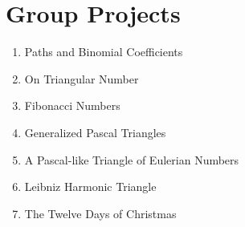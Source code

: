 \documentclass[10pt,]{book}
\theoremstyle{plain}
\theoremstyle{definition}
\theoremstyle{definition}
\theoremstyle{definition}
\numberwithin{equation}{chapter}
\begin{document}
\chapter[{Group Projects}]{Group Projects}\label{app_projects}
\hypertarget{p-1388}{}%
\leavevmode%
\begin{enumerate}
\item\hypertarget{li-178}{}Paths and Binomial Coefficients%
\item\hypertarget{li-179}{}On Triangular Number%
\item\hypertarget{li-180}{}Fibonacci Numbers%
\item\hypertarget{li-181}{}Generalized Pascal Triangles%
\item\hypertarget{li-182}{}A Pascal-like Triangle of Eulerian Numbers%
\item\hypertarget{li-183}{}Leibniz Harmonic Triangle%
\item\hypertarget{li-184}{}The Twelve Days of Christmas%
\end{enumerate}
%
\typeout{************************************************}
\typeout{************************************************}
\end{document}

